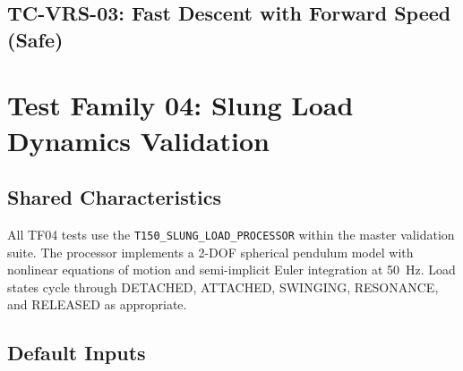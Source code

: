 \subsection{\unclass TC-VRS-03: Fast Descent with Forward Speed (Safe)}\label{sec:TCVRS03}


\pagebreak


\section{\unclass Test Family 04: Slung Load Dynamics Validation}\label{sec:TF04}

\subsection{\unclass Shared Characteristics}\label{sec:TF04Shared}

\unclass All TF04 tests use the \texttt{T150\_SLUNG\_LOAD\_PROCESSOR} within the master validation suite. The processor implements a 2-DOF spherical pendulum model with nonlinear equations of motion and semi-implicit Euler integration at 50~Hz. Load states cycle through DETACHED, ATTACHED, SWINGING, RESONANCE, and RELEASED as appropriate.

\subsection{\unclass Default Inputs}\label{sec:TF04DefaultInputs}

